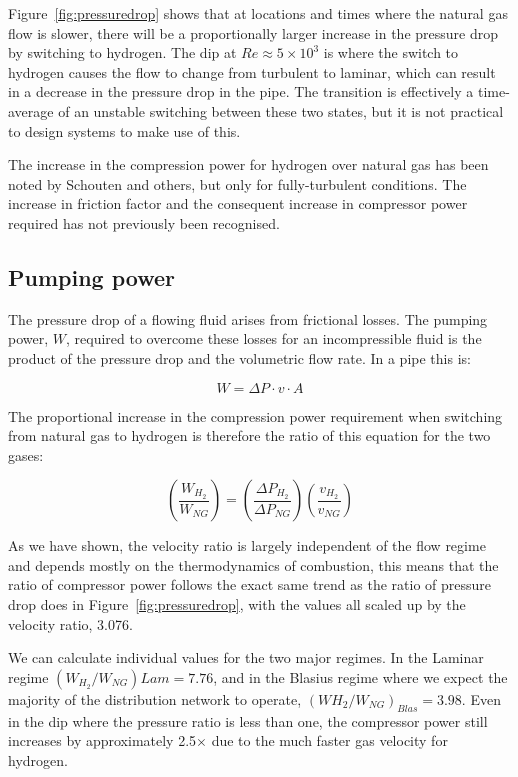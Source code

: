 \documentclass[5p]{elsarticle} %
\begin{document}
Figure~\ref{fig:pressuredrop} shows that at locations and times where the natural gas flow is slower, there will be a proportionally larger increase in the pressure drop by switching to hydrogen.
The dip at $Re\approx5\times10^3$ is where the switch to hydrogen causes the flow to change from turbulent to laminar, which can result in a decrease in the pressure drop in the pipe.
The transition is effectively a time-average of an unstable switching between these two states, but it is not practical to design systems to make use of this.

The increase in the compression power for hydrogen over natural gas has been noted by Schouten\citep{Schouten2004} and others, but only for fully-turbulent conditions. 
The increase in friction factor and the consequent increase in compressor power required has not previously been recognised.

\subsection{Pumping power}
\label{sec:comppower}

The pressure drop of a flowing fluid arises from frictional losses. 
The pumping power, $W$, required to overcome these losses for an incompressible fluid is the product of the pressure drop and the volumetric flow rate. 
In a pipe\citep{Bennet2017} this is:

\begin{equation}
\label{eqn:power}
 W = \Delta P \cdot v \cdot A 
\end{equation}

The proportional increase in the compression power requirement when switching from natural gas to hydrogen is therefore the ratio of this equation for the two gases:

\begin{equation}
\label{eqn:powerratio}
    \left(\frac{W_{H_2}}{W_{NG}}\right) =
    \left(\frac{\Delta P_{H_2}}{\Delta P_{NG}}\right)
    \left(\frac{v_{H_2}}{v_{NG}}\right)
\end{equation}

As we have shown, the velocity ratio is largely independent of the flow regime and depends mostly on the thermodynamics of combustion, this means that the ratio of compressor power follows the exact same trend as the ratio of pressure drop does in Figure~\ref{fig:pressuredrop}, with the values all scaled up by the velocity ratio, 3.076.

We can calculate individual values for the two major regimes.
In the Laminar regime $(W_{H_2}/W_{NG}){Lam} = 7.76$, and in the Blasius regime where we expect the majority of the distribution network to operate, $(W{H_2}/W_{NG})_{Blas} = 3.98$.
Even in the dip where the pressure ratio is less than one, the compressor power still increases by approximately 2.5$\times$ due to the much faster gas velocity for hydrogen.
\end{document}
